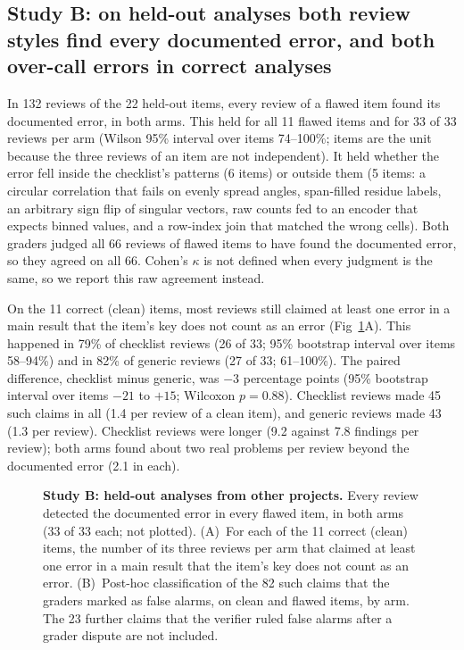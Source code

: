 \subsection*{Study B: on held-out analyses both review styles find every documented error, and both over-call errors in correct analyses}
In 132 reviews of the 22 held-out items, every review of a flawed item
found its documented error, in both arms. This held for all 11 flawed
items and for 33 of 33 reviews per arm (Wilson 95\% interval over items
74--100\%; items are the unit because the three reviews of an item are
not independent). It held whether the error fell inside the
checklist's patterns (6 items) or outside them (5 items: a circular
correlation that fails on evenly spread angles, span-filled residue
labels, an arbitrary sign flip of singular vectors, raw counts fed to an
encoder that expects binned values, and a row-index join that matched the
wrong cells). Both graders judged all 66 reviews of flawed items to have
found the documented error, so they agreed on all 66. Cohen's $\kappa$
is not defined when every judgment is the same, so we report this raw
agreement instead.

On the 11 correct (clean) items, most reviews still claimed at least
one error in a main result that the item's key does not count as an
error (Fig~\ref{fig:studyB}A). This happened in 79\% of checklist
reviews (26 of 33; 95\% bootstrap interval over items 58--94\%) and in
82\% of generic reviews (27 of 33; 61--100\%). The paired difference,
checklist minus generic, was $-3$ percentage points (95\% bootstrap
interval over items $-21$ to $+15$; Wilcoxon $p=0.88$). Checklist
reviews made 45 such claims in all (1.4 per review of a clean item), and
generic reviews made 43 (1.3 per review). Checklist reviews were longer
(9.2 against 7.8 findings per review); both arms found about two real
problems per review beyond the documented error (2.1 in each).

\begin{figure}[H]
\caption{\textbf{Study B: held-out analyses from other projects.} Every
review detected the documented error in every flawed item, in both arms
(33 of 33 each; not plotted). (A)~For each of the 11 correct (clean)
items, the number of its three reviews per arm that claimed at least one
error in a main result that the item's key does not count as an error.
(B)~Post-hoc classification of the 82 such claims that the graders
marked as false alarms, on clean and flawed items, by arm. The 23
further claims that the verifier ruled false alarms after a grader
dispute are not included.}
\label{fig:studyB}
\end{figure}

